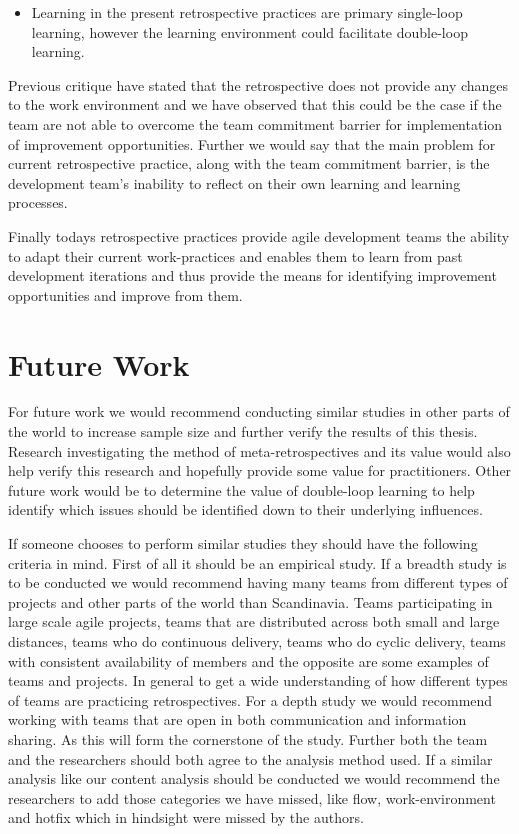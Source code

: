 \begin{itemize}
\item Learning in the present retrospective practices are primary single-loop learning, however the learning environment could facilitate double-loop learning.
\end{itemize}

Previous critique \cite{Drury2012} have stated that the retrospective does not provide any changes to the work environment and we have observed that this could be the case if the team are not able to overcome the team commitment barrier for implementation of improvement opportunities. Further we would say that the main problem for current retrospective practice, along with the team commitment barrier, is the development team's inability to reflect on their own learning and learning processes. 

Finally todays retrospective practices provide agile development teams the ability to adapt their current work-practices and enables them to learn from past development iterations and thus provide the means for identifying improvement opportunities and improve from them. 

\section{Future Work}
For future work we would recommend conducting similar studies in other parts of the world to increase sample size and further verify the results of this thesis. Research investigating the method of meta-retrospectives and its value would also help verify this research and hopefully provide some value for practitioners. Other future work would be to determine the value of double-loop learning to help identify which issues should be identified down to their underlying influences. 

If someone chooses to perform similar studies they should have the following criteria in mind. First of all it should be an empirical study\cite{Dyba2008}. If a breadth study is to be conducted we would recommend having many teams from different types of projects and other parts of the world than Scandinavia. Teams participating in large scale agile projects, teams that are distributed across both small and large distances, teams who do continuous delivery, teams who do cyclic delivery, teams with consistent availability of members and the opposite are some examples of teams and projects. In general to get a wide understanding of how different types of teams are practicing retrospectives. For a depth study we would recommend working with teams that are open in both communication and information sharing. As this will form the cornerstone of the study. Further both the team and the researchers should both agree to the analysis method used. If a similar analysis like our content analysis should be conducted we would recommend the researchers to add those categories we have missed, like flow, work-environment and hotfix which in hindsight were missed by the authors. 

